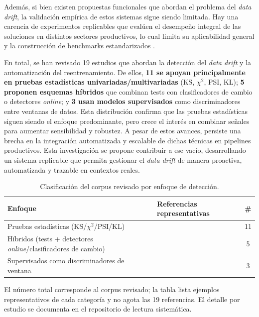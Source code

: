 Además, si bien existen propuestas funcionales que abordan el problema del \textit{data drift}, la validación empírica de estos sistemas sigue siendo limitada. Hay una carencia de experimentos replicables que evalúen el desempeño integral de las soluciones en distintos sectores productivos, lo cual limita su aplicabilidad general y la construcción de benchmarks estandarizados \citep{Agarwal2023, Singh2023}.

En total, se han revisado 19 estudios que abordan la detección del \textit{data drift} y la automatización del reentrenamiento. De ellos, \textbf{11 se apoyan principalmente en pruebas estadísticas univariadas/multivariadas} (KS, $\chi^2$, PSI, KL); \textbf{5 proponen esquemas híbridos} que combinan tests con clasificadores de cambio o detectores \textit{online}; y \textbf{3 usan modelos supervisados} como discriminadores entre ventanas de datos. Esta distribución confirma que las pruebas estadísticas siguen siendo el enfoque predominante, pero crece el interés en combinar señales para aumentar sensibilidad y robustez. A pesar de estos avances, persiste una brecha en la integración automatizada y escalable de dichas técnicas en pipelines productivos. Esta investigación se propone contribuir a ese vacío, desarrollando un sistema replicable que permita gestionar el \textit{data drift} de manera proactiva, automatizada y trazable en contextos reales.

\begin{table}[htbp]
\centering
\caption{Clasificación del corpus revisado por enfoque de detección.}
\label{tab:corpus-detectors}
\small
\begin{tabular}{l p{6.8cm} c}
\toprule
\textbf{Enfoque} & \textbf{Referencias representativas} & \textbf{\#} \\
\midrule
Pruebas estadísticas (KS/$\chi^2$/PSI/KL) & 
\citep{Gama2014,Lu2019,Chawla2021,Sethi2017,Nguyen2023} & 11 \\

Híbridos (tests + detectores \textit{online}/clasificadores de cambio) & 
\citep{BaenaGarcia2006,Bifet2010,Singh2023} & 5 \\

Supervisados como discriminadores de ventana & 
\citep{Chatterjee2023,Agarwal2023} & 3 \\
\bottomrule
\end{tabular}

\vspace{2pt}
\footnotesize
El número total corresponde al corpus revisado; la tabla lista ejemplos representativos de cada categoría y no agota las 19 referencias. El detalle por estudio se documenta en el repositorio de lectura sistemática.
\end{table}


